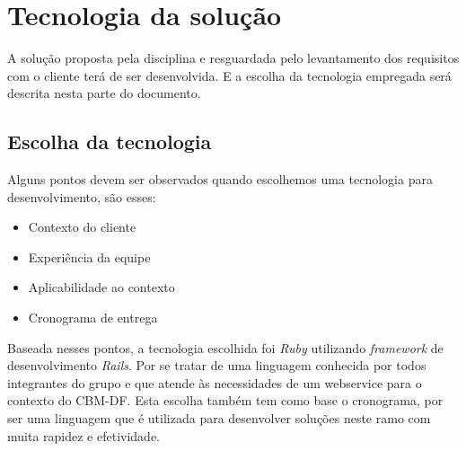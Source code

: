 \chapter[Tecnologia da solução]{Tecnologia da solução}

  A solução proposta pela disciplina e resguardada pelo levantamento dos requisitos com o cliente terá de ser desenvolvida.
  E a escolha da tecnologia empregada será descrita nesta parte do documento.
  
  \section{Escolha da tecnologia}
  
    Alguns pontos devem ser observados quando escolhemos uma tecnologia para desenvolvimento, são esses:
    
    \begin{itemize}
     \item Contexto do cliente
     \item Experiência da equipe
     \item Aplicabilidade ao contexto
     \item Cronograma de entrega
    \end{itemize}
    
    Baseada nesses pontos, a tecnologia escolhida foi \textit{Ruby} utilizando \textit{framework} de desenvolvimento \textit{Rails}.
    Por se tratar de uma linguagem conhecida por todos integrantes do grupo e que atende às necessidades 
    de um webservice para o contexto do CBM-DF. Esta escolha também tem como base o cronograma, 
    por ser uma linguagem que é utilizada para desenvolver soluções neste ramo com muita rapidez
    e efetividade.